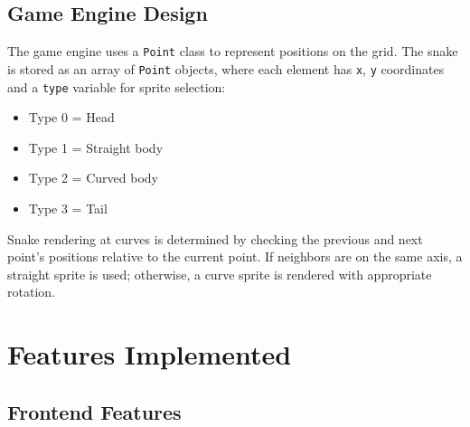 \documentclass[12pt,a4paper]{article}
\begin{document}
\subsection{Game Engine Design}

The game engine uses a \texttt{Point} class to represent positions on the grid. The snake is stored as an array of \texttt{Point} objects, where each element has \texttt{x}, \texttt{y} coordinates and a \texttt{type} variable for sprite selection:

\begin{itemize}
    \item Type 0 = Head
    \item Type 1 = Straight body
    \item Type 2 = Curved body
    \item Type 3 = Tail
\end{itemize}

Snake rendering at curves is determined by checking the previous and next point's positions relative to the current point. If neighbors are on the same axis, a straight sprite is used; otherwise, a curve sprite is rendered with appropriate rotation.

\section{Features Implemented}

\subsection{Frontend Features}
\end{document}
